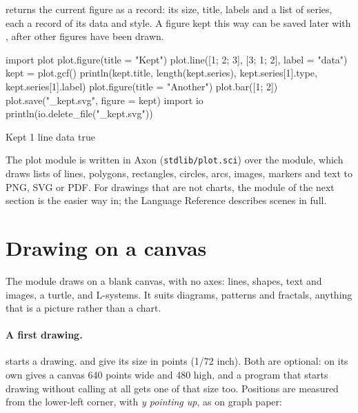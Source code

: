 \documentclass[11pt,a4paper,openany]{report}
\begin{document}
{{ returns the current figure as a record: its size, title,
labels and a list of series, each a record of its data and style. A figure kept
this way can be saved later with , after
other figures have been drawn.

\begin{axon}
import plot
plot.figure(title = "Kept")
plot.line([1; 2; 3], [3; 1; 2], label = "data")
kept = plot.gcf()
println(kept.title, length(kept.series), kept.series[1].type, kept.series[1].label)
plot.figure(title = "Another")
plot.bar([1; 2])
plot.save("_kept.svg", figure = kept)
import io
println(io.delete_file("_kept.svg"))
\end{axon}
\begin{axonout}
Kept 1 line data
true
\end{axonout}

The plot module is written in Axon (\texttt{stdlib/plot.sci}) over the
 module, which draws lists of lines, polygons, rectangles,
circles, arcs, images, markers and text to PNG, SVG or PDF. For drawings that
are not charts, the  module of the next section is the easier way
in; the Language Reference describes  scenes in full.

\section{Drawing on a canvas}\label{sec:draw}

The  module draws on a blank canvas, with no axes: lines, shapes,
text and images, a turtle, and L-systems. It suits diagrams, patterns and
fractals, anything that is a picture rather than a chart.

\paragraph{A first drawing.}  starts a drawing.
 and  give its size in points (1/72 inch). Both are
optional:  on its own gives a canvas 640 points wide and
480 high, and a program that starts drawing without calling
 at all gets one of that size too. Positions are measured
from the lower-left corner, with \emph{y pointing up}, as on graph paper:



}}
\end{document}
